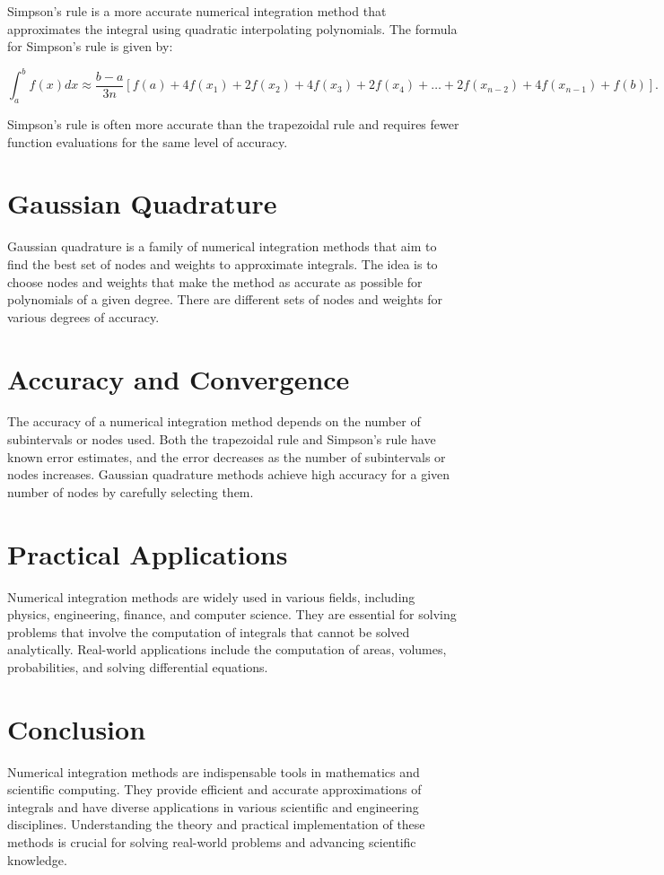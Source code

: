 \documentclass{article}
\begin{document}
Simpson's rule is a more accurate numerical integration method that approximates the integral using quadratic interpolating polynomials. The formula for Simpson's rule is given by:

\begin{equation}
\int_{a}^{b} f(x) dx \approx \frac{b - a}{3n} \left[f(a) + 4f(x_1) + 2f(x_2) + 4f(x_3) + 2f(x_4) + \ldots + 2f(x_{n-2}) + 4f(x_{n-1}) + f(b)\right].
\end{equation}

Simpson's rule is often more accurate than the trapezoidal rule and requires fewer function evaluations for the same level of accuracy.

\section{Gaussian Quadrature}

Gaussian quadrature is a family of numerical integration methods that aim to find the best set of nodes and weights to approximate integrals. The idea is to choose nodes and weights that make the method as accurate as possible for polynomials of a given degree. There are different sets of nodes and weights for various degrees of accuracy.

\section{Accuracy and Convergence}

The accuracy of a numerical integration method depends on the number of subintervals or nodes used. Both the trapezoidal rule and Simpson's rule have known error estimates, and the error decreases as the number of subintervals or nodes increases. Gaussian quadrature methods achieve high accuracy for a given number of nodes by carefully selecting them.

\section{Practical Applications}

Numerical integration methods are widely used in various fields, including physics, engineering, finance, and computer science. They are essential for solving problems that involve the computation of integrals that cannot be solved analytically. Real-world applications include the computation of areas, volumes, probabilities, and solving differential equations.

\section{Conclusion}

Numerical integration methods are indispensable tools in mathematics and scientific computing. They provide efficient and accurate approximations of integrals and have diverse applications in various scientific and engineering disciplines. Understanding the theory and practical implementation of these methods is crucial for solving real-world problems and advancing scientific knowledge.
\end{document}
